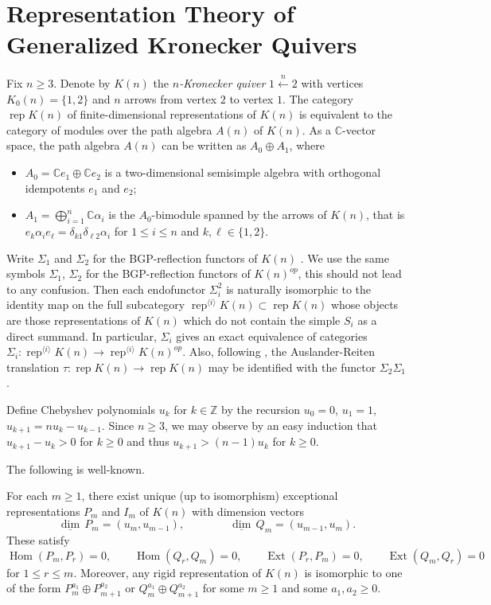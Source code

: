 \documentclass[smallextended,envcountsect,envcountsame]{svjour3}
\numberwithin{equation}{section}
\newcommand{\CC}{\mathbb{C}}
\newcommand{\ZZ}{\mathbb{Z}}
\newcommand\udim{{\underline{\dim}\, }}
\newcommand{\Ext}{\operatorname{Ext}}
\newcommand{\Hom}{\operatorname{Hom}}
\newcommand{\rep}{\operatorname{rep}}
\begin{document}
\section{Representation Theory of Generalized Kronecker Quivers}
\label{sec:RepK(n)}

\noindent Fix $n\ge3$. Denote by $K(n)$ the \emph{$n$-Kronecker quiver} $1\stackrel{n}{\longleftarrow}2$ with vertices $K_0(n)=\{1,2\}$ and $n$ arrows from vertex $2$ to vertex $1$. 
The category $\rep K(n)$ of finite-dimensional representations of $K(n)$ is equivalent to the category of modules over the path algebra $A(n)$ of $K(n)$.
As a $\CC$-vector space, the path algebra $A(n)$ can be written as $A_0\oplus A_1$, where 
\begin{itemize}
  \item $A_0=\CC e_1\oplus \CC e_2$ is a two-dimensional semisimple algebra with orthogonal idempotents $e_1$ and $e_2$;
  \item $A_1=\bigoplus_{i=1}^n \CC\alpha_i$ is the $A_0$-bimodule spanned by the arrows of $K(n)$, that is $e_k\alpha_ie_\ell=\delta_{k1}\delta_{\ell2}\alpha_i$ for $1\le i\le n$ and $k,\ell\in\{1,2\}$.
\end{itemize}

Write $\Sigma_1$ and $\Sigma_2$ for the BGP-reflection functors of $K(n)$ \cite{bgp}. 
We use the same symbols $\Sigma_1$, $\Sigma_2$ for the BGP-reflection functors of $K(n)^{op}$, this should not lead to any confusion. 
Then each endofunctor $\Sigma_i^2$ is naturally isomorphic to the identity map on the full subcategory $\rep^{\langle i\rangle} K(n)\subset \rep K(n)$ whose objects are those representations of $K(n)$ which do not contain the simple $S_i$ as a direct summand.
In particular, $\Sigma_i$ gives an exact equivalence of categories $\Sigma_i:\rep^{\langle i\rangle} K(n)\to\rep^{\langle i\rangle} K(n)^{op}$.
Also, following \cite{brenner-butler}, the Auslander-Reiten translation $\tau:\rep K(n)\to\rep K(n)$ may be identified with the functor $\Sigma_2\Sigma_1$.

Define Chebyshev polynomials $u_k$ for $k\in\ZZ$ by the recursion $u_0=0$, $u_1=1$, $u_{k+1}=nu_k-u_{k-1}$.
Since $n\ge3$, we may observe by an easy induction that $u_{k+1}-u_k>0$ for $k\ge0$ and thus $u_{k+1}>(n-1)u_k$ for $k\ge0$.

The following is well-known.
\begin{theorem}
  \label{th:rigids}
  For each $m\ge1$, there exist unique (up to isomorphism) exceptional representations $P_m$ and $I_m$ of $K(n)$ with dimension vectors 
  \[\udim P_m=(u_m,u_{m-1}),\qquad\qquad \udim Q_m=(u_{m-1},u_m).\]
  These satisfy 
  \[\Hom(P_m,P_r)=0, \qquad \Hom(Q_r,Q_m)=0, \qquad \Ext(P_r,P_m)=0, \qquad \Ext(Q_m,Q_r)=0\]
  for $1\leq r\leq m$.
  Moreover, any rigid representation of $K(n)$ is isomorphic to one of the form $P_m^{a_1}\oplus P_{m+1}^{a_2}$ or $Q_m^{a_1}\oplus Q_{m+1}^{a_2}$ for some $m\ge1$ and some $a_1,a_2\ge0$.
\end{theorem}
\end{document}
